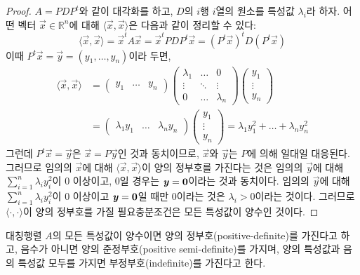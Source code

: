 \documentclass[sections/engineering_mathematics_lecture_note.tex]{subfiles}
\begin{document}
\begin{proof}
    $A = PDP^t$와 같이 대각화를 하고, $D$의 $i$행 $i$열의 원소를 특성값 $\lambda_i$라 하자.
    어떤 벡터 $\vec x \in \mathbb R^n$에 대해 $\langle \vec x, \vec x\rangle$은 다음과 같이 정리할 수 있다:
    \begin{equation*}
        \langle \vec x, \vec x\rangle = \vec x^t A \vec x = \vec x^t PDP^t \vec x = (P^t \vec x)^t D (P^t \vec x)
    \end{equation*}
    이때 $P^t \vec x = \vec y = (y_1, \dots, y_n)$이라 두면,
    \begin{align*}
        \langle \vec x, \vec x\rangle &=
        \begin{pmatrix}
            y_1 & \dots & y_n
        \end{pmatrix}
        \begin{pmatrix}
            \lambda_1 & \dots & 0\\
            \vdots & \ddots & \vdots\\
            0 & \dots & \lambda_n
        \end{pmatrix}
        \begin{pmatrix}
            y_1 \\ \vdots \\ y_n
        \end{pmatrix}\\
                                      &=
        \begin{pmatrix}
            \lambda_1 y_1 & \dots & \lambda_n y_n
        \end{pmatrix}
        \begin{pmatrix}
            y_1 \\ \vdots \\ y_n
        \end{pmatrix}
        = \lambda_1 y_1^2 + \dots + \lambda_n y_n^2
    \end{align*}
    그런데 $P^t \vec x = \vec y$은 $\vec x = P \vec y$인 것과 동치이므로, $\vec x$와 $\vec y$는 $P$에 의해 일대일 대응된다.
    그러므로 임의의 $\vec x$에 대해 $\langle \vec x, \vec x\rangle$이 양의 정부호를 가진다는 것은 임의의 $\vec y$에 대해 $\sum_{i = 1}^n \lambda_i y_i^2$이 0 이상이고, 0일 경우는 $\bm{\mathit{y}} = \bm{\mathrm{0}}$이라는 것과 동치이다.
    임의의 $\vec y$에 대해 $\sum_{i = 1}^n \lambda_i y_i^2$이 0 이상이고 $\bm{\mathit{y}} = \bm{\mathrm{0}}$일 때만 0이라는 것은 $\lambda_i > 0$이라는 것이다.
    그러므로 $\langle \cdot, \cdot \rangle$이 양의 정부호를 가질 필요충분조건은 모든 특성값이 양수인 것이다.
\end{proof}

\begin{definition}
    대칭행렬 $A$의 모든 특성값이 양수이면 양의 정부호(positive-definite)를 가진다고 하고, 음수가 아니면 양의 준정부호(positive semi-definite)를 가지며, 양의 특성값과 음의 특성값 모두를 가지면 부정부호(indefinite)를 가진다고 한다.
\end{definition}
\end{document}
